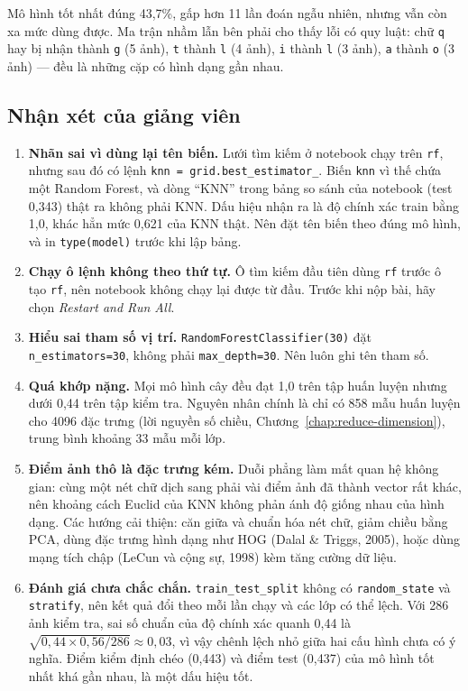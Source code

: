 
Mô hình tốt nhất đúng 43,7\%, gấp hơn 11 lần đoán ngẫu nhiên, nhưng vẫn còn xa mức dùng được. Ma trận nhầm lẫn bên phải cho thấy lỗi có quy luật: chữ \texttt{q} hay bị nhận thành \texttt{g} (5 ảnh), \texttt{t} thành \texttt{l} (4 ảnh), \texttt{i} thành \texttt{l} (3 ảnh), \texttt{a} thành \texttt{o} (3 ảnh) --- đều là những cặp có hình dạng gần nhau.

\subsection{Nhận xét của giảng viên}

\begin{enumerate}
    \item \textbf{Nhãn sai vì dùng lại tên biến.} Lưới tìm kiếm ở notebook chạy trên \texttt{rf}, nhưng sau đó có lệnh \texttt{knn = grid.best\_estimator\_}. Biến \texttt{knn} vì thế chứa một Random Forest, và dòng ``KNN'' trong bảng so sánh của notebook (test 0,343) thật ra không phải KNN. Dấu hiệu nhận ra là độ chính xác train bằng 1,0, khác hẳn mức 0,621 của KNN thật. Nên đặt tên biến theo đúng mô hình, và in \texttt{type(model)} trước khi lập bảng.
    \item \textbf{Chạy ô lệnh không theo thứ tự.} Ô tìm kiếm đầu tiên dùng \texttt{rf} trước ô tạo \texttt{rf}, nên notebook không chạy lại được từ đầu. Trước khi nộp bài, hãy chọn \textit{Restart and Run All}.
    \item \textbf{Hiểu sai tham số vị trí.} \texttt{RandomForestClassifier(30)} đặt \texttt{n\_estimators=30}, không phải \texttt{max\_depth=30}. Nên luôn ghi tên tham số.
    \item \textbf{Quá khớp nặng.} Mọi mô hình cây đều đạt 1,0 trên tập huấn luyện nhưng dưới 0,44 trên tập kiểm tra. Nguyên nhân chính là chỉ có 858 mẫu huấn luyện cho 4096 đặc trưng (lời nguyền số chiều, Chương~\ref{chap:reduce-dimension}), trung bình khoảng 33 mẫu mỗi lớp.
    \item \textbf{Điểm ảnh thô là đặc trưng kém.} Duỗi phẳng làm mất quan hệ không gian: cùng một nét chữ dịch sang phải vài điểm ảnh đã thành vector rất khác, nên khoảng cách Euclid của KNN không phản ánh độ giống nhau của hình dạng. Các hướng cải thiện: căn giữa và chuẩn hóa nét chữ, giảm chiều bằng PCA, dùng đặc trưng hình dạng như HOG (Dalal \& Triggs, 2005), hoặc dùng mạng tích chập (LeCun và cộng sự, 1998) kèm tăng cường dữ liệu.
    \item \textbf{Đánh giá chưa chắc chắn.} \texttt{train\_test\_split} không có \texttt{random\_state} và \texttt{stratify}, nên kết quả đổi theo mỗi lần chạy và các lớp có thể lệch. Với 286 ảnh kiểm tra, sai số chuẩn của độ chính xác quanh 0,44 là $\sqrt{0{,}44 \times 0{,}56 / 286} \approx 0{,}03$, vì vậy chênh lệch nhỏ giữa hai cấu hình chưa có ý nghĩa. Điểm kiểm định chéo (0,443) và điểm test (0,437) của mô hình tốt nhất khá gần nhau, là một dấu hiệu tốt.
\end{enumerate}

